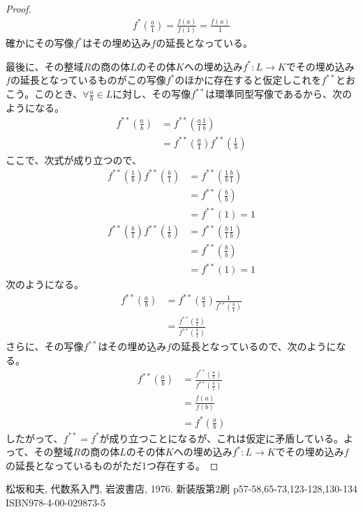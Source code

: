 \documentclass[dvipdfmx]{jsarticle}
\begin{document}
\begin{proof}
\begin{align*}
f^{*}\left( \frac{a}{1} \right) = \frac{f(a)}{f(1)} = \frac{f(a)}{1}
\end{align*}
確かにその写像$f^{*}$はその埋め込み$f$の延長となっている。\par
最後に、その整域$R$の商の体$L$のその体$K$への埋め込み$f^{*}:L \rightarrow K$でその埋め込み$f$の延長となっているものがこの写像$f^{*}$のほかに存在すると仮定しこれを$f^{**}$とおこう。このとき、$\forall\frac{a}{b} \in L$に対し、その写像$f^{**}$は環準同型写像であるから、次のようになる。
\begin{align*}
f^{**}\left( \frac{a}{b} \right) &= f^{**}\left( \frac{a}{1}\frac{1}{b} \right)\\
&= f^{**}\left( \frac{a}{1} \right)f^{**}\left( \frac{1}{b} \right)
\end{align*}
ここで、次式が成り立つので、
\begin{align*}
f^{**}\left( \frac{1}{b} \right)f^{**}\left( \frac{b}{1} \right) &= f^{**}\left( \frac{1}{b}\frac{b}{1} \right)\\
&= f^{**}\left( \frac{b}{b} \right)\\
&= f^{**}(1) = 1\\
f^{**}\left( \frac{b}{1} \right)f^{**}\left( \frac{1}{b} \right) &= f^{**}\left( \frac{b}{1}\frac{1}{b} \right)\\
&= f^{**}\left( \frac{b}{b} \right)\\
&= f^{**}(1) = 1
\end{align*}
次のようになる。
\begin{align*}
f^{**}\left( \frac{a}{b} \right) &= f^{**}\left( \frac{a}{1} \right)\frac{1}{f^{**}\left( \frac{b}{1} \right)}\\
&= \frac{f^{**}\left( \frac{a}{1} \right)}{f^{**}\left( \frac{b}{1} \right)}
\end{align*}
さらに、その写像$f^{**}$はその埋め込み$f$の延長となっているので、次のようになる。
\begin{align*}
f^{**}\left( \frac{a}{b} \right) &= \frac{f^{**}\left( \frac{a}{1} \right)}{f^{**}\left( \frac{b}{1} \right)}\\
&= \frac{f(a)}{f(b)}\\
&= f^{*}\left( \frac{a}{b} \right)
\end{align*}
したがって、$f^{**} = f^{*}$が成り立つことになるが、これは仮定に矛盾している。よって、その整域$R$の商の体$L$のその体$K$への埋め込み$f^{*}:L \rightarrow K$でその埋め込み$f$の延長となっているものがただ1つ存在する。
\end{proof}
\begin{thebibliography}{50}
  松坂和夫, 代数系入門, 岩波書店, 1976. 新装版第2刷 p57-58,65-73,123-128,130-134 ISBN978-4-00-029873-5
\end{thebibliography}
\end{document}
